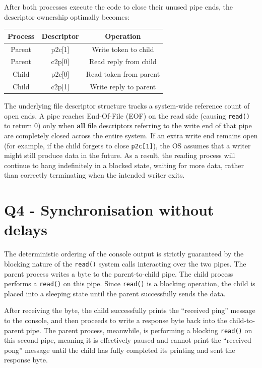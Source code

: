 \documentclass[11pt,a4paper]{article}
\begin{document}
After both processes execute the code to close their unused pipe ends, the descriptor ownership optimally becomes:

\begin{center}
\begin{tabular}{|c|c|c|}
\hline
\textbf{Process} & \textbf{Descriptor} & \textbf{Operation} \\
\hline
Parent & p2c[1] & Write token to child \\
\hline
Parent & c2p[0] & Read reply from child \\
\hline
Child & p2c[0] & Read token from parent \\
\hline
Child & c2p[1] & Write reply to parent \\
\hline
\end{tabular}
\end{center}

The underlying file descriptor structure tracks a system-wide reference count of open ends. A pipe reaches End-Of-File (EOF) on the read side (causing \texttt{read()} to return 0) only when \textbf{all} file descriptors referring to the write end of that pipe are completely closed across the entire system. If an extra write end remains open (for example, if the child forgets to close \texttt{p2c[1]}), the OS assumes that a writer might still produce data in the future. As a result, the reading process will continue to hang indefinitely in a blocked state, waiting for more data, rather than correctly terminating when the intended writer exits.

\section*{Q4 - Synchronisation without delays}

The deterministic ordering of the console output is strictly guaranteed by the blocking nature of the \texttt{read()} system calls interacting over the two pipes. The parent process writes a byte to the parent-to-child pipe. The child process performs a \texttt{read()} on this pipe. Since \texttt{read()} is a blocking operation, the child is placed into a sleeping state until the parent successfully sends the data. 

After receiving the byte, the child successfully prints the ``received ping'' message to the console, and then proceeds to write a response byte back into the child-to-parent pipe. The parent process, meanwhile, is performing a blocking \texttt{read()} on this second pipe, meaning it is effectively paused and cannot print the ``received pong'' message until the child has fully completed its printing and sent the response byte.
\end{document}
